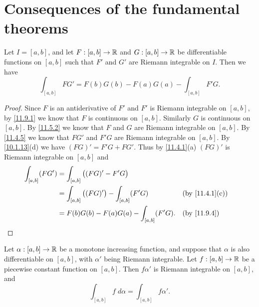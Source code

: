 \section{Consequences of the fundamental theorems}\label{sec:11.10}

\begin{prop}\label{11.10.1}
  Let \(I = [a, b]\), and let \(F : [a, b] \to \mathbb{R}\) and \(G : [a, b] \to \mathbb{R}\) be differentiable functions on \([a, b]\) such that \(F'\) and \(G'\) are Riemann integrable on \(I\).
  Then we have
  \[
    \int_{[a, b]} F G' = F(b) G(b) - F(a) G(a) - \int_{[a, b]} F' G.
  \]
\end{prop}

\begin{proof}
  Since \(F\) is an antiderivative of \(F'\) and \(F'\) is Riemann integrable on \([a, b]\), by \cref{11.9.1} we know that \(F\) is continuous on \([a, b]\).
  Similarly \(G\) is continuous on \([a, b]\).
  By \cref{11.5.2} we know that \(F\) and \(G\) are Riemann integrable on \([a, b]\).
  By \cref{11.4.5} we know that \(F G'\) and \(F' G\) are Riemann integrable on \([a, b]\).
  By \cref{10.1.13}(d) we have \((FG)' = F' G + F G'\).
  Thus by \cref{11.4.1}(a) \((FG)'\) is Riemann integrable on \([a, b]\) and
  \begin{align*}
    \int_{[a, b]} (F G') & = \int_{[a, b]} \big((FG)' - F' G\big)                                                   \\
                         & = \int_{[a, b]} \big((FG)'\big) - \int_{[a, b]} (F' G) &  & \text{(by \cref{11.4.1}(c))} \\
                         & = F(b) G(b) - F(a) G(a) - \int_{[a, b]} (F' G).        &  & \by{11.9.4}
  \end{align*}
\end{proof}

\begin{thm}\label{11.10.2}
  Let \(\alpha : [a, b] \to \mathbb{R}\) be a monotone increasing function, and suppose that \(\alpha\) is also differentiable on \([a, b]\), with \(\alpha'\) being Riemann integrable.
  Let \(f : [a, b] \to \mathbb{R}\) be a piecewise constant function on \([a, b]\).
  Then \(f \alpha'\) is Riemann integrable on \([a, b]\), and
  \[
    \int_{[a, b]} f \; d \alpha = \int_{[a, b]} f \alpha'.
  \]
\end{thm}

